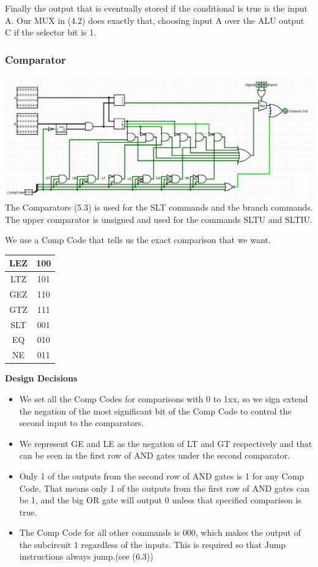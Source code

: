 \documentclass{article}
\begin{document}
Finally the output that is eventually stored if the conditional is true is the input A. Our MUX in (4.2) does exactly that, choosing input A over the ALU output C if the selector bit is 1.

\subsubsection{Comparator}
\includegraphics{Compare.png}
The Comparators (5.3) is used for the SLT commands and the branch commands. The upper comparator is unsigned and used for the commands SLTU and SLTIU. 

We use a Comp Code that tells us the exact comparison that we want. 

\begin{tabular}{| c | c |}
\hline 
LEZ & 100 \\ \hline
LTZ & 101 \\ \hline
GEZ & 110 \\ \hline
GTZ & 111 \\ \hline
SLT & 001 \\ \hline
EQ &  010 \\ \hline
NE &  011 \\ \hline
\end{tabular}

\textbf{Design Decisions}
\begin{itemize}
\item
We set all the Comp Codes for comparisons with 0 to 1xx, so we sign extend the negation of the most significant bit of the Comp Code to control the second input to the comparators. 
\item
We represent GE and LE as the negation of LT and GT respectively and that can be seen in the first row of AND gates under the second comparator.
\item
Only 1 of the outputs from the second row of AND gates is 1 for any Comp Code. That means only 1 of the outputs from the first row of AND gates can be 1, and the big OR gate will output 0 unless that specified comparison is true. 
\item
The Comp Code for all other commands is 000, which makes the output of the subcircuit 1 regardless of the inputs. This is required so that Jump instructions always jump.(see (6.3))
\end{itemize}
\end{document}
